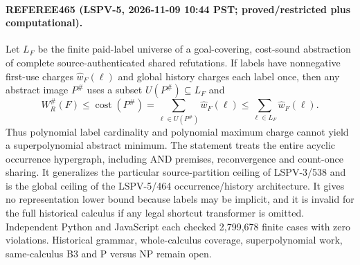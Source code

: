 \paragraph{REFEREE465 (LSPV-5, 2026-11-09 10:44 PST; proved/restricted plus computational).}
Let $L_F$ be the finite paid-label universe of a goal-covering,
cost-sound abstraction of complete source-authenticated shared refutations.
If labels have nonnegative first-use charges $\widehat w_F(\ell)$ and global
history charges each label once, then any abstract image $P^\#$ uses a subset
$U(P^\#)\subseteq L_F$ and
\[
 W_R^\#(F)\leq \operatorname{cost}(P^\#)
 =\sum_{\ell\in U(P^\#)}\widehat w_F(\ell)
 \leq\sum_{\ell\in L_F}\widehat w_F(\ell).
\]
Thus polynomial label cardinality and polynomial maximum charge cannot yield a
superpolynomial abstract minimum.  The statement treats the entire acyclic
occurrence hypergraph, including AND premises, reconvergence and count-once
sharing.  It generalizes the particular source-partition ceiling of
LSPV-3/538 and is the global ceiling of the LSPV-5/464 occurrence/history
architecture.  It gives no representation lower bound because labels may be
implicit, and it is invalid for the full historical calculus if any legal
shortcut transformer is omitted.  Independent Python and JavaScript each
checked 2,799,678 finite cases with zero violations.  Historical grammar,
whole-calculus coverage, superpolynomial work, same-calculus B3 and P versus NP
remain open.
